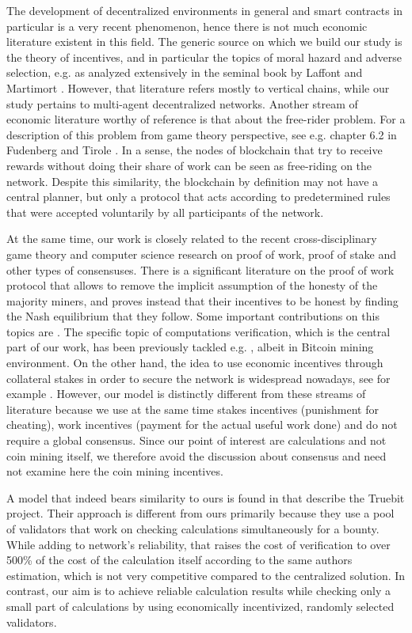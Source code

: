 \documentclass[conference]{IEEEtran}
\begin{document}
The development of decentralized  environments in general and smart contracts in particular is a very recent phenomenon, hence there is not much economic literature existent in this field. The generic source on which we build our study is the theory of incentives, and in particular the topics of moral hazard and adverse selection, e.g. as analyzed extensively in the seminal book by Laffont and Martimort \cite{Laffont}. However, that literature refers mostly to vertical chains, while our study pertains to multi-agent decentralized networks. Another stream of economic literature worthy of reference is that about the free-rider problem. For a description of this problem from game theory perspective, see e.g. chapter 6.2 in Fudenberg and Tirole \cite{gametheory}. In a sense, the nodes of blockchain that try to receive rewards without doing their share of work can be seen as free-riding on the network. Despite this similarity, the blockchain by definition may not have a central planner, but only a protocol that acts according to predetermined rules that were accepted voluntarily by all participants of the network.

At the same time, our work is closely related to the recent cross-disciplinary game theory and computer science research on proof of work, proof of stake and other types of consensuses. There is a significant literature on the proof of work protocol that allows to remove the implicit assumption of the honesty of the majority miners, and proves instead that their incentives to be honest by finding the Nash equilibrium that they follow. Some important contributions on this topics are \cite{Houy, Badertscher}. The specific topic of computations verification, which is the central part of our work, has been previously tackled e.g. \cite{Kumaresan}, albeit in Bitcoin mining environment. On the other hand, the idea to use  economic incentives through collateral stakes in order to secure the network is widespread nowadays, see for example \cite{ouroboros, snowwhite}. However, our model is distinctly different from these streams of literature because we use at the same time stakes incentives (punishment for cheating), work incentives (payment for the actual useful work done) and do not require a global consensus. Since our point of interest are calculations and not coin mining itself, we therefore avoid the discussion about consensus and need not examine here the coin mining incentives. 

A model that indeed bears similarity to ours is found in \cite{truebit} that describe the Truebit project. Their approach is different from ours primarily because they use a pool of validators that work on checking calculations simultaneously for a bounty. While adding to network's reliability, that raises the cost of verification to over 500\% of the cost of the calculation itself according to the same authors estimation, which is not very competitive compared to the centralized solution. In contrast, our aim is to achieve reliable calculation results while checking only a small part of calculations by using economically incentivized, randomly selected validators.
\end{document}
